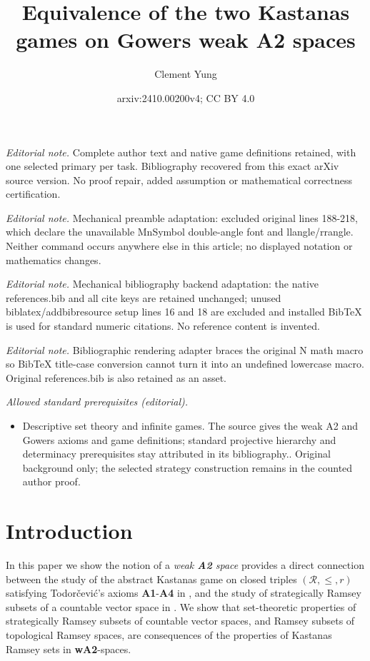 \documentclass[11pt,reqno]{amsart}
\title{Equivalence of the two Kastanas games on Gowers weak A2 spaces}
\author{Clement Yung}
\date{arxiv:2410.00200v4; CC BY 4.0}
\theoremstyle{plain}
\numberwithin{equation}{section}
\theoremstyle{definition}
\newcommand{\cal}{\mathcal}
\begin{document}
\maketitle
\noindent\textit{Editorial note.} Complete author text and native game definitions retained, with one selected primary per task. Bibliography recovered from this exact arXiv source version. No proof repair, added assumption or mathematical correctness certification.\par\medskip
\noindent\textit{Editorial note.} Mechanical preamble adaptation: excluded original lines 188-218, which declare the unavailable MnSymbol double-angle font and llangle/rrangle. Neither command occurs anywhere else in this article; no displayed notation or mathematics changes.\par\medskip
\noindent\textit{Editorial note.} Mechanical bibliography backend adaptation: the native references.bib and all cite keys are retained unchanged; unused biblatex/addbibresource setup lines 16 and 18 are excluded and installed BibTeX is used for standard numeric citations. No reference content is invented.\par\medskip
\noindent\textit{Editorial note.} Bibliographic rendering adapter braces the original N math macro so BibTeX title-case conversion cannot turn it into an undefined lowercase macro. Original references.bib is also retained as an asset.\par\medskip
\noindent\textit{Allowed standard prerequisites (editorial).}\begin{itemize}
\item Descriptive set theory and infinite games. The source gives the weak A2 and Gowers axioms and game definitions; standard projective hierarchy and determinacy prerequisites stay attributed in its bibliography.. Original background only; the selected strategy construction remains in the counted author proof.
\end{itemize}\medskip
\section{Introduction}
In this paper we show the notion of a \emph{weak \textbf{A2} space} provides a direct connection between the study of the abstract Kastanas game on closed triples $(\cal{R},\leq,r)$ satisfying Todor\v{c}evi\'{c}'s axioms \textbf{A1}-\textbf{A4} in \cite{CD23}, and the study of strategically Ramsey subsets of a countable vector space in \cite{R08}. We show that set-theoretic properties of strategically Ramsey subsets of countable vector spaces, and Ramsey subsets of topological Ramsey spaces, are consequences of the properties of Kastanas Ramsey sets in \textbf{wA2}-spaces. 
\end{document}
